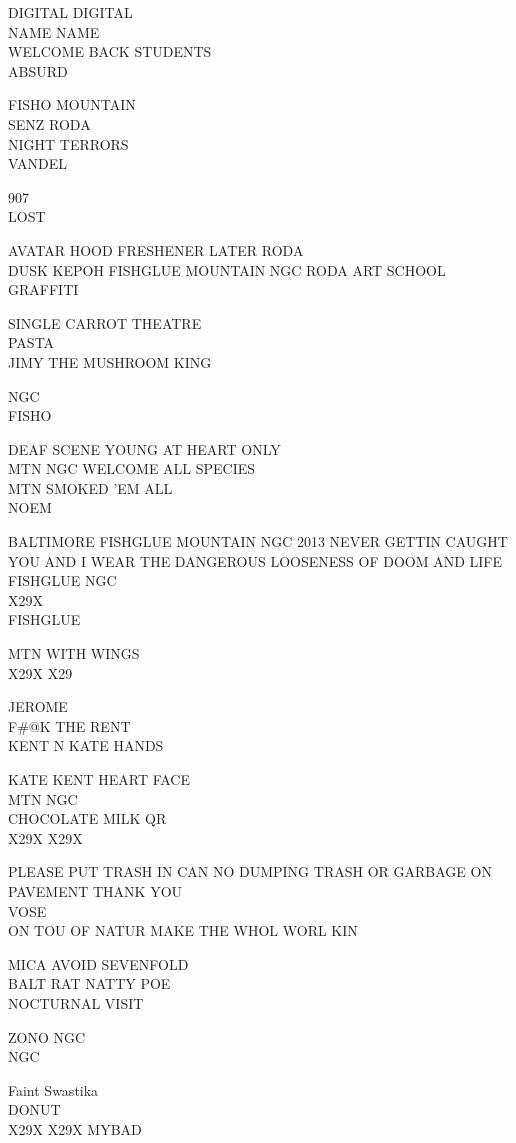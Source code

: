 \documentclass[10pt,letterpaper]{article}
\begin{document}
DIGITAL DIGITAL\\
NAME NAME\\
WELCOME BACK STUDENTS\\
ABSURD

FISHO MOUNTAIN\\
SENZ RODA\\
NIGHT TERRORS\\
VANDEL

907\\
LOST

AVATAR HOOD FRESHENER LATER RODA\\
DUSK KEPOH FISHGLUE MOUNTAIN NGC RODA ART SCHOOL GRAFFITI

SINGLE CARROT THEATRE\\
PASTA\\
JIMY THE MUSHROOM KING

NGC\\
FISHO

DEAF SCENE YOUNG AT HEART ONLY\\
MTN NGC WELCOME ALL SPECIES\\
MTN SMOKED 'EM ALL\\
NOEM

BALTIMORE FISHGLUE MOUNTAIN NGC 2013 NEVER GETTIN CAUGHT\\
YOU AND I WEAR THE DANGEROUS LOOSENESS OF DOOM AND LIFE FISHGLUE NGC\\
X29X\\
FISHGLUE

MTN WITH WINGS\\
X29X X29

JEROME\\
F\#@K THE RENT\\
KENT N KATE HANDS

KATE KENT HEART FACE\\
MTN NGC\\
CHOCOLATE MILK QR\\
X29X X29X

PLEASE PUT TRASH IN CAN NO DUMPING TRASH OR GARBAGE ON PAVEMENT THANK YOU\\
VOSE\\
ON TOU OF NATUR MAKE THE WHOL WORL KIN

MICA AVOID SEVENFOLD\\
BALT RAT NATTY POE\\
NOCTURNAL VISIT

ZONO NGC\\
NGC

Faint Swastika\\
DONUT\\
X29X X29X MYBAD
\end{document}
